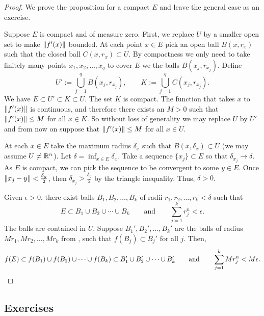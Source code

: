 \begin{proof}
We prove the proposition for a compact $E$ and leave the general case as
an exercise.

Suppose $E$ is compact and of measure zero.
First, we replace $U$ by a smaller open set to make $\lVert {f'(x)} \rVert$ bounded.
At each point $x \in
E$ pick an open ball $B(x,r_x)$ such that the closed ball $C(x,r_x) \subset
U$.  By compactness we only need to take finitely
many points $x_1,x_2,\ldots,x_q$ to cover $E$ we the balls $B(x_j,r_{x_j})$.  Define
\begin{equation*}
U' := \bigcup_{j=1}^q B(x_j,r_{x_j}), \qquad
K := \bigcup_{j=1}^q C(x_j,r_{x_j}).
\end{equation*}
We have $E \subset U' \subset K \subset U$.  The set $K$ is compact.
The function that takes $x$ to $\lVert {f'(x)} \rVert$ is continuous, and therefore
there exists an $M > 0$ such that $\lVert {f'(x)} \rVert \leq M$ for all $x \in K$.
So without loss of generality we may replace $U$ by $U'$ and from now on
suppose that $\lVert {f'(x)} \rVert \leq M$ for all $x \in U$.

At each $x \in E$ take the maximum radius $\delta_x$
such that $B(x,\delta_x) \subset U$ (we may assume $U \not= {\mathbb{R}}^n$).
Let $\delta = \inf_{x\in E} \delta_x$.
Take a sequence $\{ x_j \} \subset E$ so that $\delta_{x_j} \to \delta$.
As $E$ is compact, we can pick the sequence to be convergent to some $y \in
E$.  Once $\lVert {x_j-y} \rVert < \frac{\delta_y}{2}$, then
$\delta_{x_j} > \frac{\delta_y}{2}$ by the triangle inequality.
Thus, $\delta > 0$.

Given $\epsilon > 0$, there exist balls $B_1,B_2,\ldots,B_k$ of radii
$r_1,r_2,\ldots,r_k < \delta$ such that
\begin{equation*}
E \subset B_1 \cup B_2 \cup \cdots \cup B_k
\qquad \text{and} \qquad
\sum_{j=1}^k r_j^n < \epsilon.
\end{equation*}
The balls are contained in $U$.
Suppose $B_1', B_2', \ldots, B_k'$ are the balls of radius
$Mr_1, Mr_2, \ldots, Mr_k$ from
, such that $f(B_j) \subset B_j'$ for all $j$.
Then,
\begin{equation*}
f(E) \subset f(B_1) \cup f(B_2) \cup \cdots \cup f(B_k)
\subset B_1' \cup B_2' \cup \cdots \cup B_k'
\qquad \text{and} \qquad
\sum_{j=1}^k Mr_j^n
 < M \epsilon. \qedhere
\end{equation*}
\end{proof}

\subsection{Exercises}

